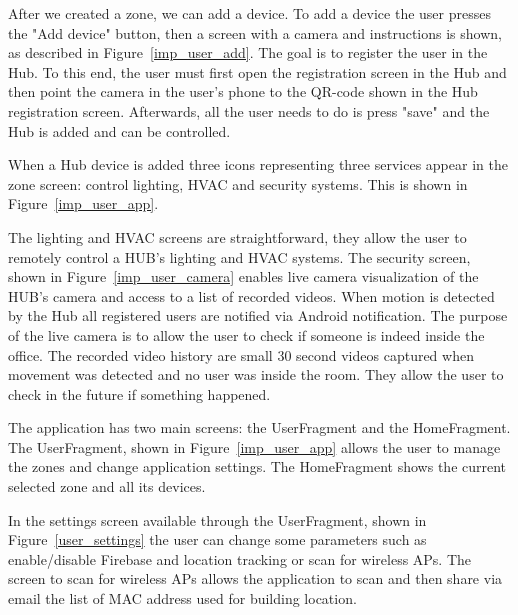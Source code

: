 After we created a zone, we can add a device. To add a device the user presses the "Add device" button, then a screen with a camera and instructions is shown, as described in Figure~\ref{imp_user_add}. The goal is to register the user in the Hub. To this end, the user must first open the registration screen in the Hub and then point the camera in the user's phone to the QR-code shown in the Hub registration screen. Afterwards, all the user needs to do is press "save" and the Hub is added and can be controlled.


When a Hub device is added three icons representing three services appear in the zone screen: control lighting, \ac{HVAC} and security systems. This is shown in Figure~\ref{imp_user_app}.

The lighting and \ac{HVAC} screens are straightforward, they allow the user to remotely control a HUB's lighting and \ac{HVAC} systems. The security screen, shown in Figure~\ref{imp_user_camera} enables live camera visualization of the HUB's camera and access to a list of recorded videos. When motion is detected by the Hub all registered users are notified via Android notification. The purpose of the live camera is to allow the user to check if someone is indeed inside the office. The recorded video history are small 30 second videos captured when movement was detected and no user was inside the room. They allow the user to check in the future if something happened.


The application has two main screens: the UserFragment and the HomeFragment. The UserFragment, shown in Figure~\ref{imp_user_app} allows the user to manage the zones and change application settings. The HomeFragment shows the current selected zone and all its devices.

In the settings screen available through the UserFragment, shown in Figure~\ref{user_settings} the user can change some parameters such as enable/disable Firebase and location tracking or scan for wireless APs. The screen to scan for wireless APs allows the application to scan and then share via email the list of \ac{MAC} address used for building location.





